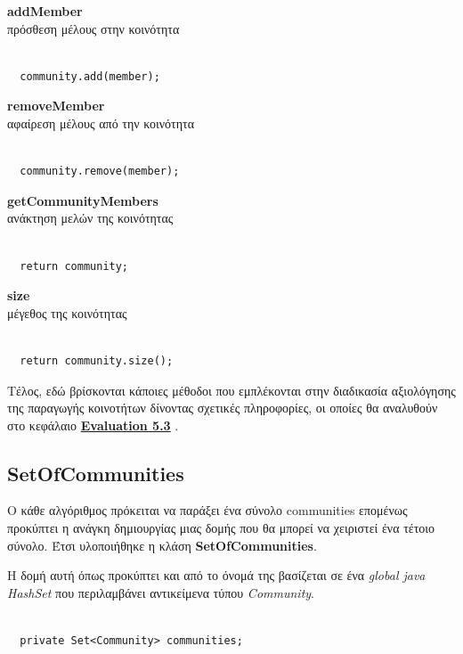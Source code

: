 \begin{description}
\item \textbf{addMember}  \hfill \\
  πρόσθεση μέλους στην κοινότητα
\begin{lstlisting}[frame=single]  % Start your code-block

  community.add(member);
\end{lstlisting}
\item \textbf{removeMember}  \hfill \\
  αφαίρεση μέλους από την κοινότητα
\begin{lstlisting}[frame=single]  % Start your code-block

  community.remove(member);
\end{lstlisting}
\item \textbf{getCommunityMembers}   \hfill \\
  ανάκτηση μελών της κοινότητας
\begin{lstlisting}[frame=single]  % Start your code-block

  return community;
\end{lstlisting}
\item \textbf{size}   \hfill \\
  μέγεθος της κοινότητας
\begin{lstlisting}[frame=single]  % Start your code-block

  return community.size();
\end{lstlisting}
\end{description}



Τέλος, εδώ βρίσκονται κάποιες μέθοδοι που εμπλέκονται στην διαδικασία αξιολόγησης της παραγωγής κοινοτήτων δίνοντας σχετικές πληροφορίες, οι οποίες θα αναλυθούν
στο κεφάλαιο \textbf{\hyperref[eval]{Εvaluation 5.3} }.


\subsection{SetOfCommunities}
\label{SetOfCommunities}
\noindent
Ο κάθε αλγόριθμος πρόκειται να παράξει ένα σύνολο communities επομένως προκύπτει η ανάγκη δημιουργίας μιας δομής που θα
μπορεί να χειριστεί ένα τέτοιο σύνολο. Έτσι υλοποιήθηκε η κλάση \textbf{SetOfCommunities}.

Η δομή αυτή όπως προκύπτει και από το όνομά της βασίζεται σε ένα \emph{global java HashSet} που περιλαμβάνει
αντικείμενα τύπου \emph{Community}.\\
\begin{lstlisting}[frame=single]  % Start your code-block

  private Set<Community> communities;
\end{lstlisting}

